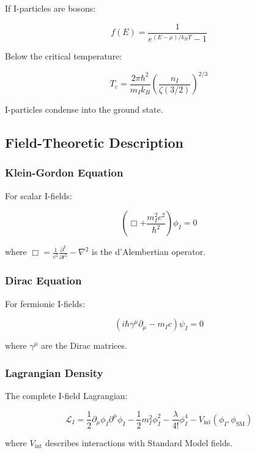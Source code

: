 If I-particles are bosons:

\begin{equation}
\label{eq:bose_einstein}
f(E) = \frac{1}{e^{(E-\mu)/k_B T} - 1}
\end{equation}

Below the critical temperature:

\begin{equation}
\label{eq:bec_critical_temperature}
T_c = \frac{2\pi\hbar^2}{m_I k_B}\left(\frac{n_I}{\zeta(3/2)}\right)^{2/3}
\end{equation}

I-particles condense into the ground state.

\subsection{Field-Theoretic Description}

\subsubsection{Klein-Gordon Equation}

For scalar I-fields:

\begin{equation}
\label{eq:klein_gordon}
\left(\Box + \frac{m_I^2 c^2}{\hbar^2}\right)\phi_I = 0
\end{equation}

where $\Box = \frac{1}{c^2}\frac{\partial^2}{\partial t^2} - \nabla^2$ is the d'Alembertian operator.

\subsubsection{Dirac Equation}

For fermionic I-fields:

\begin{equation}
\label{eq:dirac}
\left(i\hbar\gamma^\mu\partial_\mu - m_I c\right)\psi_I = 0
\end{equation}

where $\gamma^\mu$ are the Dirac matrices.

\subsubsection{Lagrangian Density}

The complete I-field Lagrangian:

\begin{equation}
\label{eq:i_field_lagrangian}
\mathcal{L}_I = \frac{1}{2}\partial_\mu\phi_I\partial^\mu\phi_I - \frac{1}{2}m_I^2\phi_I^2 - \frac{\lambda}{4!}\phi_I^4 - V_{\text{int}}(\phi_I, \phi_{\text{SM}})
\end{equation}

where $V_{\text{int}}$ describes interactions with Standard Model fields.
